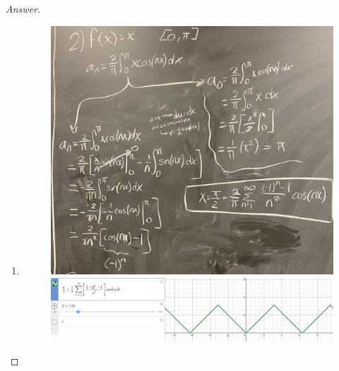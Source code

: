 \documentclass{article}
\theoremstyle{definition}
\renewcommand\qedsymbol{$\blacksquare$}
\newenvironment{ans}{\begin{proof}[Answer]\renewcommand{\qedsymbol}{}}{\end{proof}}
\begin{document}
\begin{ans}
\begin{enumerate}
        \item \phantom{.} \begin{figure}[H]
            \centering
            \includegraphics[width = \textwidth]{Problem 5-2.jpg}
            \includegraphics[width = \textwidth]{Problem 5.2.png}
        \end{figure}


\end{enumerate}
\end{ans}
\end{document}
